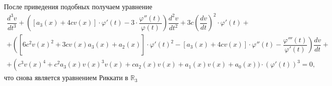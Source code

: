 После приведения подобных получаем уравнение
\begin{multline*}
    \dfrac{d^3v}{dt^3} + \left( \left[ a_3(x) + 4c v(x) \right ] \cdot \varphi'(t) - 3 \cdot \dfrac{\varphi''(t)}{\varphi(t)} \right) \dfrac{d^2v}{dt^2} + 3c \left( \dfrac{dv}{dt} \right)^2 \cdot \varphi'(t) + \\ + \left( \right. \left[ \right. 6 c^2 v(x)^2 + 3c v(x) a_3(x) + a_2(x) \left. \right] \cdot \varphi'(t)^2 - \left[ a_3(x) + 4c v(x) \right] \cdot \varphi''(t) - \dfrac{\varphi'''(t)}{\varphi'(t)} \left. \right) \dfrac{dv}{dt} + \\ + \left( \right. c^3 v(x)^4 + c^2 a_3(x) v(x)^3 v(x) + c a_2(x) v(x) + a_1(x) v(x) + a_0(x) \big) \cdot \left( \varphi'(t) \right)^3 = 0,
\end{multline*}
что снова является уравнением Риккати в $\mathbb{R}_3$

